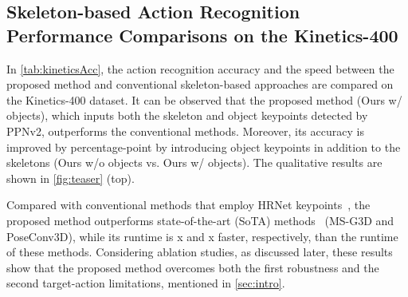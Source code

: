\documentclass[10pt,twocolumn,letterpaper]{article}
\begin{document}
\subsection{Skeleton-based Action Recognition Performance Comparisons on the Kinetics-400}
In \cref{tab:kineticsAcc}, the action recognition accuracy and the speed between the proposed method and conventional skeleton-based approaches are compared on the Kinetics-400 dataset.
It can be observed that the proposed method (Ours w/ objects), which inputs both the skeleton and object keypoints detected by PPNv2, outperforms the conventional methods.
Moreover, its accuracy is improved by  percentage-point by introducing object keypoints in addition to the skeletons (Ours w/o objects vs. Ours w/ objects).
The qualitative results are shown in \cref{fig:teaser} (top).

Compared with conventional methods that employ HRNet keypoints~\cite{Sun2019CVPR}, the proposed method outperforms state-of-the-art (SoTA) methods~\cite{Liu2020CVPR,Duan2022CVPR} (MS-G3D and PoseConv3D), while its runtime is x and x faster, respectively, than the runtime of these methods.
Considering ablation studies, as discussed later, these results show that the proposed method overcomes both the first robustness and the second target-action limitations, mentioned in \cref{sec:intro}.
\end{document}
